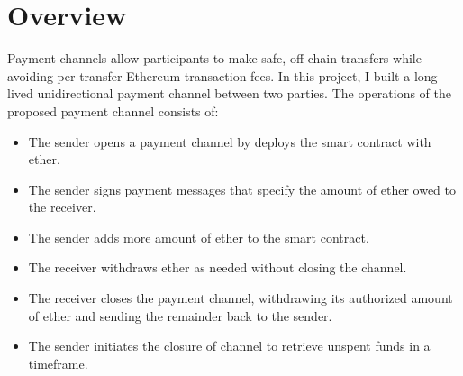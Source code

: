 \section{Overview}\label{sec:overview}
Payment channels allow participants to make safe, off-chain transfers while avoiding per-transfer Ethereum transaction
fees.
In this project, I built a long-lived unidirectional payment channel between two parties.
The operations of the proposed payment channel consists of:
\begin{itemize}
    \item The sender opens a payment channel by deploys the smart contract with ether.
    \item The sender signs payment messages that specify the amount of ether owed to the receiver.
    \item The sender adds more amount of ether to the smart contract.
    \item The receiver withdraws ether as needed without closing the channel.
    \item The receiver closes the payment channel, withdrawing its authorized amount of ether and sending the remainder
    back to the sender.
    \item The sender initiates the closure of channel to retrieve unspent funds in a timeframe.
\end{itemize}